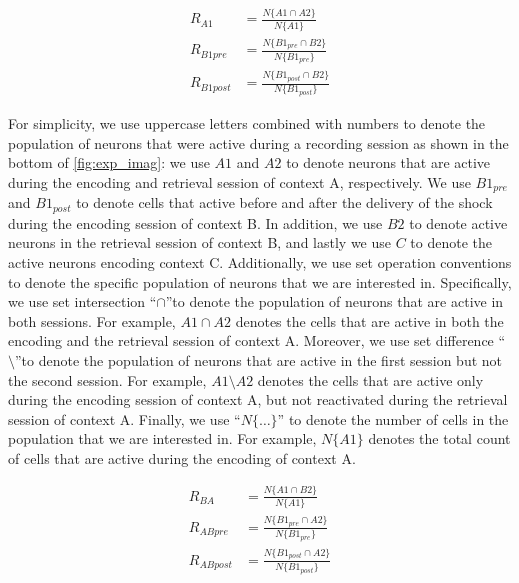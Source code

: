 \documentclass[master.tex]{subfiles}
\begin{document}
\begin{figure}
  \vspace{-15pt}
  \begin{align} \label{eq_react}
    R_{A1} & = \frac{N\{A1 \cap A2\}}{N\{A1\}} \nonumber \\
    R_{B1pre} & = \frac{N\{B1_{pre} \cap B2\}}{N\{B1_{pre}\}} \nonumber \\
    R_{B1post} & = \frac{N\{B1_{post} \cap B2\}}{N\{B1_{post}\}}
  \end{align}
  \vspace{-15pt}
\end{figure}

For simplicity, we use uppercase letters combined with numbers to denote the
population of neurons that were active during a recording session as shown in
the bottom of \autoref{fig:exp_imag}: we use $A1$ and $A2$ to denote neurons
that are active during the encoding and retrieval session of context A,
respectively. We use $B1_{pre}$ and $B1_{post}$ to denote cells that active
before and after the delivery of the shock during the encoding session of
context B. In addition, we use $B2$ to denote active neurons in the retrieval
session of context B, and lastly we use $C$ to denote the active neurons
encoding context C. Additionally, we use set operation conventions to denote the
specific population of neurons that we are interested in. Specifically, we use
set intersection ``$\cap$''to denote the population of neurons that are active
in both sessions. For example, $A1 \cap A2$ denotes the cells that are active in
both the encoding and the retrieval session of context A. Moreover, we use set
difference ``$\setminus$''to denote the population of neurons that are active in
the first session but not the second session. For example, $A1 \setminus A2$
denotes the cells that are active only during the encoding session of context A,
but not reactivated during the retrieval session of context A. Finally, we use
``$N\{\ldots\}$'' to denote the number of cells in the population that we are
interested in. For example, $N\{A1\}$ denotes the total count of cells that are
active during the encoding of context A.

\begin{figure}
\vspace{-15pt}
  \begin{align} \label{eq_drift}
    R_{BA} & = \frac{N\{A1 \cap B2\}}{N\{A1\}} \nonumber \\
    R_{ABpre} & = \frac{N\{B1_{pre} \cap A2\}}{N\{B1_{pre}\}} \nonumber \\
    R_{ABpost} & = \frac{N\{B1_{post} \cap A2\}}{N\{B1_{post}\}}
  \end{align}
\vspace{-15pt}
\end{figure}
\end{document}
